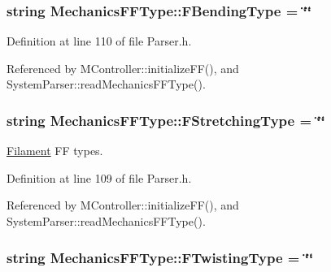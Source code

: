 \hypertarget{structMechanicsFFType_acbd0076ef804005b56b6db07dce03589}{
\subsubsection[{F\+Bending\+Type}]{\setlength{\rightskip}{0pt plus 5cm}string Mechanics\+F\+F\+Type\+::\+F\+Bending\+Type = \char`\"{}\char`\"{}}}\label{structMechanicsFFType_acbd0076ef804005b56b6db07dce03589}


Definition at line 110 of file Parser.\+h.



Referenced by M\+Controller\+::initialize\+F\+F(), and System\+Parser\+::read\+Mechanics\+F\+F\+Type().

\hypertarget{structMechanicsFFType_ad887670c75c1e05b77187cdae1c849fa}{
\subsubsection[{F\+Stretching\+Type}]{\setlength{\rightskip}{0pt plus 5cm}string Mechanics\+F\+F\+Type\+::\+F\+Stretching\+Type = \char`\"{}\char`\"{}}}\label{structMechanicsFFType_ad887670c75c1e05b77187cdae1c849fa}


\hyperlink{classFilament}{Filament} F\+F types. 



Definition at line 109 of file Parser.\+h.



Referenced by M\+Controller\+::initialize\+F\+F(), and System\+Parser\+::read\+Mechanics\+F\+F\+Type().

\hypertarget{structMechanicsFFType_a7cde64b003b7a90a9f3fa13b5dbe573f}{
\subsubsection[{F\+Twisting\+Type}]{\setlength{\rightskip}{0pt plus 5cm}string Mechanics\+F\+F\+Type\+::\+F\+Twisting\+Type = \char`\"{}\char`\"{}}}\label{structMechanicsFFType_a7cde64b003b7a90a9f3fa13b5dbe573f}


